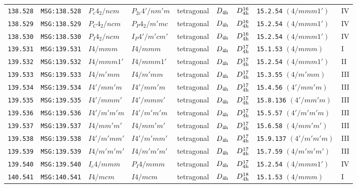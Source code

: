 \documentclass[fleqn,10pt]{jsarticle}
\begin{document}
\begin{center}
\begin{longtable}{lllllllll}
\texttt{138.528} & \texttt{MSG:138.528} & $P_{c}4_{2}/ncm$ & $P_{2c}4'/nm'm$ & tetragonal & $D_{\rm 4h}$ & $D_{\rm 4h}^{16}$ & \texttt{15.2.54} $(4/mmm1')$ & IV \\
\texttt{138.529} & \texttt{MSG:138.529} & $P_{C}4_{2}/ncm$ & $P_{P}4_{2}/m'mc$ & tetragonal & $D_{\rm 4h}$ & $D_{\rm 4h}^{16}$ & \texttt{15.2.54} $(4/mmm1')$ & IV \\
\texttt{138.530} & \texttt{MSG:138.530} & $P_{I}4_{2}/ncm$ & $I_{P}4'/m'cm'$ & tetragonal & $D_{\rm 4h}$ & $D_{\rm 4h}^{16}$ & \texttt{15.2.54} $(4/mmm1')$ & IV \\ \hline
\texttt{139.531} & \texttt{MSG:139.531} & $I4/mmm$ & $I4/mmm$ & tetragonal & $D_{\rm 4h}$ & $D_{\rm 4h}^{17}$ & \texttt{15.1.53} $(4/mmm)$ & I \\
\texttt{139.532} & \texttt{MSG:139.532} & $I4/mmm1'$ & $I4/mmm1'$ & tetragonal & $D_{\rm 4h}$ & $D_{\rm 4h}^{17}$ & \texttt{15.2.54} $(4/mmm1')$ & II \\
\texttt{139.533} & \texttt{MSG:139.533} & $I4/m'mm$ & $I4/m'mm$ & tetragonal & $D_{\rm 4h}$ & $D_{\rm 4h}^{17}$ & \texttt{15.3.55} $(4/m'mm)$ & III \\
\texttt{139.534} & \texttt{MSG:139.534} & $I4'/mm'm$ & $I4'/mm'm$ & tetragonal & $D_{\rm 4h}$ & $D_{\rm 4h}^{17}$ & \texttt{15.4.56} $(4'/mm'm)$ & III \\
\texttt{139.535} & \texttt{MSG:139.535} & $I4'/mmm'$ & $I4'/mmm'$ & tetragonal & $D_{\rm 4h}$ & $D_{\rm 4h}^{17}$ & \texttt{15.8.136} $(4'/mm'm)$ & III \\
\texttt{139.536} & \texttt{MSG:139.536} & $I4'/m'm'm$ & $I4'/m'm'm$ & tetragonal & $D_{\rm 4h}$ & $D_{\rm 4h}^{17}$ & \texttt{15.5.57} $(4'/m'm'm)$ & III \\
\texttt{139.537} & \texttt{MSG:139.537} & $I4/mm'm'$ & $I4/mm'm'$ & tetragonal & $D_{\rm 4h}$ & $D_{\rm 4h}^{17}$ & \texttt{15.6.58} $(4/mm'm')$ & III \\
\texttt{139.538} & \texttt{MSG:139.538} & $I4'/m'mm'$ & $I4'/m'mm'$ & tetragonal & $D_{\rm 4h}$ & $D_{\rm 4h}^{17}$ & \texttt{15.9.137} $(4'/m'm'm)$ & III \\
\texttt{139.539} & \texttt{MSG:139.539} & $I4/m'm'm'$ & $I4/m'm'm'$ & tetragonal & $D_{\rm 4h}$ & $D_{\rm 4h}^{17}$ & \texttt{15.7.59} $(4/m'm'm')$ & III \\
\texttt{139.540} & \texttt{MSG:139.540} & $I_{c}4/mmm$ & $P_{I}4/mmm$ & tetragonal & $D_{\rm 4h}$ & $D_{\rm 4h}^{17}$ & \texttt{15.2.54} $(4/mmm1')$ & IV \\ \hline
\texttt{140.541} & \texttt{MSG:140.541} & $I4/mcm$ & $I4/mcm$ & tetragonal & $D_{\rm 4h}$ & $D_{\rm 4h}^{18}$ & \texttt{15.1.53} $(4/mmm)$ & I \\

\end{longtable}
\end{center}
\end{document}
